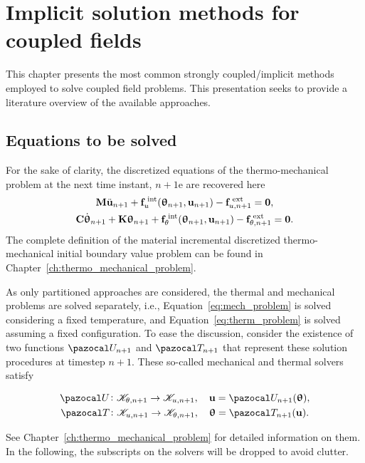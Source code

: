 \chapter {Implicit solution methods for coupled fields} \label{chapter:implicit_meth}

This chapter presents the most common strongly coupled/implicit methods employed to solve coupled field problems.
This presentation seeks to provide a literature overview of the available approaches.


\section{Equations to be solved}

For the sake of clarity, the discretized equations of the thermo-mechanical problem at the next time instant, \(n+1\)e are recovered here
\begin{gather}
    \mathbf M \ddot{\mathbf u}_{n+1} +\mathbf f_u^\text{\;int}(\bm \uptheta_{n+1}, \mathbf u_{n+1})-\mathbf f^\text{\;ext}_{u,n+1}=\mathbf 0, \label{eq:mech_problem} \\
    \mathbf C \dot{\bm \uptheta}_{n+1} + \mathbf K \bm \uptheta_{n+1} +\mathbf f_\theta^\text{\;int}(\bm \uptheta_{n+1}, \mathbf u_{n+1})-\mathbf f^\text{\;ext}_{\theta,n+1}=\mathbf 0. \label{eq:therm_problem}
\end{gather}
The complete definition of the material incremental discretized thermo-mechanical initial boundary value problem can be found in Chapter~\ref{ch:thermo_mechanical_problem}.

As only partitioned approaches are considered, the thermal and mechanical problems are solved separately, i.e., Equation~\eqref{eq:mech_problem} is solved considering a fixed temperature, and Equation~\eqref{eq:therm_problem} is solved assuming a fixed configuration.
To ease the discussion, consider the existence of two functions \(\pazocal U_{n+1}\) and \(\pazocal T_{n+1}\) that represent these solution procedures at timestep \(n+1\).
These so-called mechanical and thermal solvers satisfy
\begin{highlight}[innertopmargin=-5pt]
\begin{gather}
  \pazocal U\colon \mathscr K_{\theta, n+1}\to \mathscr K_{u,n+1},\quad \mathbf u = \pazocal U_{n+1}(\bm \uptheta),\\
  \pazocal T\colon \mathscr K_{u,n+1}\to \mathscr K_{\theta, n+1},\quad \bm \uptheta = \pazocal T_{n+1}(\mathbf u).
\end{gather}
\end{highlight}
See Chapter~\ref{ch:thermo_mechanical_problem} for detailed information on them.
In the following, the subscripts on the solvers will be dropped to avoid clutter.

